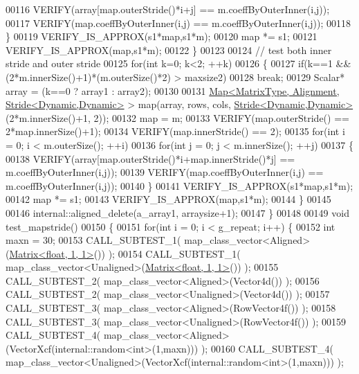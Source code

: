 \begin{DoxyCode}
00116         VERIFY(array[map.outerStride()*i+j] == m.coeffByOuterInner(i,j));
00117         VERIFY(map.coeffByOuterInner(i,j) == m.coeffByOuterInner(i,j));
00118       \}
00119     VERIFY\_IS\_APPROX(s1*map,s1*m);
00120     map *= s1;
00121     VERIFY\_IS\_APPROX(map,s1*m);
00122   \}
00123 
00124   \textcolor{comment}{// test both inner stride and outer stride}
00125   \textcolor{keywordflow}{for}(\textcolor{keywordtype}{int} k=0; k<2; ++k)
00126   \{
00127     \textcolor{keywordflow}{if}(k==1 && (2*m.innerSize()+1)*(m.outerSize()*2) > maxsize2)
00128       \textcolor{keywordflow}{break};
00129     Scalar* array = (k==0 ? array1 : array2);
00130     
00131     \hyperlink{group___core___module_class_eigen_1_1_map}{Map<MatrixType, Alignment, Stride<Dynamic,Dynamic>} > 
      map(array, rows, cols, \hyperlink{group___core___module_class_eigen_1_1_stride}{Stride<Dynamic,Dynamic>}(2*m.innerSize()+1, 2));
00132     map = m;
00133     VERIFY(map.outerStride() == 2*map.innerSize()+1);
00134     VERIFY(map.innerStride() == 2);
00135     \textcolor{keywordflow}{for}(\textcolor{keywordtype}{int} i = 0; i < m.outerSize(); ++i)
00136       \textcolor{keywordflow}{for}(\textcolor{keywordtype}{int} j = 0; j < m.innerSize(); ++j)
00137       \{
00138         VERIFY(array[map.outerStride()*i+map.innerStride()*j] == m.coeffByOuterInner(i,j));
00139         VERIFY(map.coeffByOuterInner(i,j) == m.coeffByOuterInner(i,j));
00140       \}
00141     VERIFY\_IS\_APPROX(s1*map,s1*m);
00142     map *= s1;
00143     VERIFY\_IS\_APPROX(map,s1*m);
00144   \}
00145 
00146   internal::aligned\_delete(a\_array1, arraysize+1);
00147 \}
00148 
00149 \textcolor{keywordtype}{void} test\_mapstride()
00150 \{
00151   \textcolor{keywordflow}{for}(\textcolor{keywordtype}{int} i = 0; i < g\_repeat; i++) \{
00152     \textcolor{keywordtype}{int} maxn = 30;
00153     CALL\_SUBTEST\_1( map\_class\_vector<Aligned>(\hyperlink{group___core___module_class_eigen_1_1_matrix}{Matrix<float, 1, 1>}()) );
00154     CALL\_SUBTEST\_1( map\_class\_vector<Unaligned>(\hyperlink{group___core___module_class_eigen_1_1_matrix}{Matrix<float, 1, 1>}()) );
00155     CALL\_SUBTEST\_2( map\_class\_vector<Aligned>(Vector4d()) );
00156     CALL\_SUBTEST\_2( map\_class\_vector<Unaligned>(Vector4d()) );
00157     CALL\_SUBTEST\_3( map\_class\_vector<Aligned>(RowVector4f()) );
00158     CALL\_SUBTEST\_3( map\_class\_vector<Unaligned>(RowVector4f()) );
00159     CALL\_SUBTEST\_4( map\_class\_vector<Aligned>(VectorXcf(internal::random<int>(1,maxn))) );
00160     CALL\_SUBTEST\_4( map\_class\_vector<Unaligned>(VectorXcf(internal::random<int>(1,maxn))) );

\end{DoxyCode}
